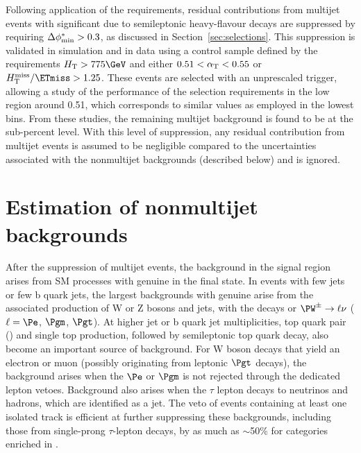 Following application of the \alphat requirements, residual
contributions from multijet events with significant \ptvecmiss due to
semileptonic heavy-flavour decays are suppressed by requiring $\Delta\phi^{*}_\text{min} >
0.3$, as discussed in Section~\ref{sec:selections}. This suppression
is validated in simulation and in data using a control sample defined
by the requirements $\scalht > 775 \GeV$ and either $0.51 < \alpha_\mathrm{T} <
0.55$ or $\mhtmet > 1.25$.  These events are selected with an
unprescaled \scalht trigger, allowing a study of the performance of
the selection requirements in the low \alphat region around 0.51,
which corresponds to similar \HTmiss values as employed in the lowest
\scalht bins.  From these studies, the remaining multijet background
is found to be at the sub-percent level. With this level of
suppression, any residual contribution from multijet events is assumed
to be negligible compared to the uncertainties associated with the
nonmultijet backgrounds (described below) and is ignored.

\section{Estimation of nonmultijet backgrounds\label{sec:ewk}}

After the suppression of multijet events, the background in the signal
region arises from SM processes with genuine \ptvecmiss in the final
state.  In events with few jets or few b quark jets, the largest
backgrounds with genuine \ptvecmiss arise from the associated
production of W or Z bosons and jets, with the decays \znunu or
$\PW^\pm \to \ell\nu$ ($\ell=\Pe$, $\Pgm$, $\Pgt$). At higher jet or b
quark jet multiplicities, top quark pair (\ttbar) and single top
production, followed by semileptonic top quark decay, also become an
important source of background. For W boson decays that yield an
electron or muon (possibly originating from leptonic $\Pgt$ decays),
the background arises when the $\Pe$ or $\Pgm$ is not rejected through
the dedicated lepton vetoes. Background also arises when the $\tau$
lepton decays to neutrinos and hadrons, which are identified as a
jet. The veto of events containing at least one isolated track is
efficient at further suppressing these backgrounds, including those
from single-prong $\tau$-lepton decays, by as much as $\sim$50\% for
categories enriched in \ttbar.

